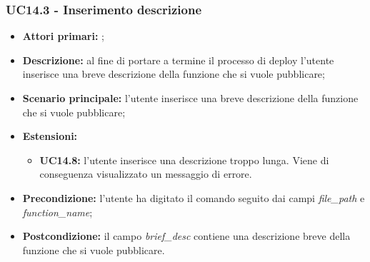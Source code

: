 \subsubsection{UC14.3 - Inserimento descrizione}
\begin{itemize}
	\item \textbf{Attori primari:} \us{};
	\item \textbf{Descrizione:} al fine di portare a termine il processo di deploy l’utente inserisce una breve descrizione della funzione che si vuole pubblicare;  
	\item \textbf{Scenario principale:} l’utente inserisce una breve descrizione della funzione che si vuole pubblicare;  
	\item \textbf{Estensioni:} 
	\begin{itemize}
		\item \textbf{UC14.8:} l’utente inserisce una descrizione troppo lunga. Viene di conseguenza visualizzato un messaggio di errore. 
	\end{itemize}
	\item \textbf{Precondizione:}  l’utente ha digitato il comando \deploy{} seguito dai campi \textit{file\_path} e \textit{function\_name};
	\item \textbf{Postcondizione:} il campo \textit{brief\_desc} contiene una descrizione breve della funzione che si vuole pubblicare.
\end{itemize}